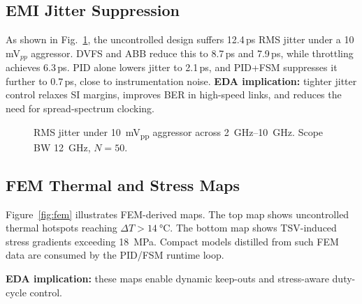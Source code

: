 \documentclass[conference]{IEEEtran}
\begin{document}
\subsection{EMI Jitter Suppression}
As shown in Fig.~\ref{fig:emi}, the uncontrolled design suffers 12.4\,ps RMS jitter under a 10\,mV$_{pp}$ aggressor. DVFS and ABB reduce this to 8.7\,ps and 7.9\,ps, while throttling achieves 6.3\,ps. PID alone lowers jitter to 2.1\,ps, and PID+FSM suppresses it further to 0.7\,ps, close to instrumentation noise.  
\textbf{EDA implication:} tighter jitter control relaxes SI margins, improves BER in high-speed links, and reduces the need for spread-spectrum clocking.

\begin{figure}[t]
\centering
{}
\caption{RMS jitter under \SI{10}{mV_{pp}} aggressor across \SIrange{2}{10}{GHz}. Scope BW \SI{12}{GHz}, $N=50$.}
\label{fig:emi}
\end{figure}

\subsection{FEM Thermal and Stress Maps}
Figure~\ref{fig:fem} illustrates FEM-derived maps. The top map shows uncontrolled thermal hotspots reaching $\Delta T>\SI{14}{\celsius}$. The bottom map shows TSV-induced stress gradients exceeding \SI{18}{MPa}. Compact models distilled from such FEM data are consumed by the PID/FSM runtime loop.
\par\noindent\textbf{EDA implication:} these maps enable dynamic keep-outs and stress-aware duty-cycle control.
\end{document}
